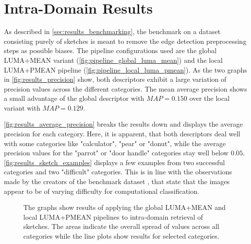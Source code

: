 \section{Intra-Domain Results}\label{sec:intra_results}

As described in \autoref{sec:results_benchmarking}, the benchmark on a dataset
consisting purely of sketches is meant to remove the edge detection
preprocessing steps as possible biases. The pipeline configurations used are
the global LUMA+MEAN variant (\autoref{fig:pipeline_global_luma_mean}) and the
local LUMA+PMEAN pipeline (\autoref{fig:pipeline_local_luma_pmean}). As the two
graphs in \autoref{fig:results_precision} show, both descriptors exhibit a
large variation of precision values across the different categories. The mean
average precision shows a small advantage of the global descriptor with
$MAP=0.150$ over the local variant with $MAP=0.129$.

\autoref{fig:results_average_precision} breaks the results down and displays
the average precision for each category. Here, it is apparent, that both
descriptors deal well with some categories like "calculator", "pear" or "donut",
while the average precision values for the "parrot" or "door handle" categories
stay well below $0.05$. \autoref{fig:results_sketch_examples} displays a few
examples from two successful categories and two "difficult" categories. This is
in line with the observations made by the creators of the benchmark dataset
\autocite{eitz_how_2012}, that state that the images appear to be of varying
difficulty for computational classification. 

\begin{figure}[h]
    \centering
    \quad
    \caption[Precision and Recall Results]{
        The graphs show results of applying the global LUMA+MEAN
         and local LUMA+PMEAN
         pipelines to
        intra-domain retrieval of sketches. The areas indicate the overall
        spread of values across all categories while the line plots show
        results for selected categories.
    }
    \label{fig:results_precision}
\end{figure}


